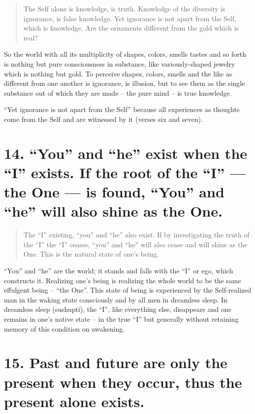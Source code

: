 \documentclass[12pt]{report}
\begin{document}
\begin{quote}
  The Self alone is knowledge, is truth. Knowledge of the diversity is
  ignorance, is false knowledge. Yet ignorance is not apart from the
  Self, which is knowledge. Are the ornaments different from the gold
  which is real?
\end{quote}


So the world with all its multiplicity of shapes, colors, smells
tastes and so forth is nothing but pure consciousness in substance,
like variously-shaped jewelry which is nothing but gold. To perceive
shapes, colors, smells and the like as different from one another is
ignorance, is illusion, but to see them as the single substance out of
which they are made -- the pure mind -- is true knowledge.

``Yet ignorance is not apart from the Self'' because all experiences
as thoughts come from the Self and are witnessed by it (verses six and
seven). 

\section{14. ``You'' and ``he'' exist when the ``I'' exists. If the
  root of the ``I'' --- the One --- is found, ``You'' and ``he'' will
  also shine as the One.}

\begin{quote}
  The ``I'' existing, ``you'' and ``he'' also exist. If by investigating
  the truth of the ``I'' the ``I'' ceases, ``you'' and ``he'' will also
  cease and will shine as the One. This is the natural state of one's
  being.

\end{quote}

``You'' and ``he'' are the world; it stands and falls with the ``I''
or ego, which constructs it. Realizing one's being is realizing the
whole world to be the same effulgent being -- ``the One''. This state
of being is experienced by the Self-realized man in the waking state
consciously and by all men in dreamless sleep. In dreamless sleep
(sushupti), the ``I'', like everything else, disappears and one
remains in one's native state -- in the true ``I'' but generally
without retaining memory of this condition on awakening.

\section{15. Past and future are only the present when they occur,
  thus the present alone exists.}
\end{document}
